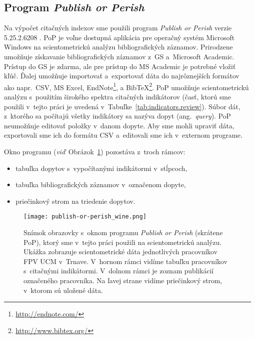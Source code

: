 \subsection{Program \emph{Publish or Perish}}
\label{sec:pop}

Na výpočet citačných indexov sme použili program \emph{Publish or Perish} verzie
5.25.2.6208 \citep{Harzing2011}.  PoP je voľne dostupná aplikácia pre operačný
systém Microsoft Windows na scientometrickú analýzu bibliografických záznamov.
Prirodzene umožňuje získavanie bibliografických záznamov z~GS a~Microsoft
Academic.  Prístup do GS je zdarma, ale pre prístup do MS Academic je potrebné
vložiť kľúč.  Ďalej umožňuje importovať a~exportovať dáta do najrôznejších
formátov ako napr.~CSV, MS Excel, EndNote\footnote{\url{http://endnote.com/}},
a BibTeX\footnote{\url{http://www.bibtex.org/}}.  PoP umožňuje scientometrickú
analýzu s~použitím širokého spektra citačných indikátorov (časť, ktorú sme
použili v~tejto práci je uvedená v~Tabuľke~\ref{tab:indicators.review}).  Súbor
dát, z~ktorého sa počítajú všetky indikátory sa nazýva dopyt
(ang.~\emph{query}).  PoP neumožňuje editovať položky v~danom dopyte.  Aby sme
mohli upraviť dáta, exportovali sme ich do formátu CSV a~editovali sme ich
v~externom programe.

Okno programu (\emph{viď}~Obrázok~\ref{fig:pop.screenshot}) pozostáva z~troch
rámcov:
\begin{itemize}
\item tabuľka dopytov s~vypočítanými indikátormi v~stĺpcoch,
\item tabuľka bibliografických záznamov v~označenom dopyte,
\item priečinkový strom na triedenie dopytov.
\end{itemize}

\begin{figure}
  \centering
  \texttt{[image: publish-or-perish\_wine.png]}
  \caption[Snímok obrazovky s~oknom programu \emph{Publish or Perish}]%
  {Snímok obrazovky s~oknom programu \emph{Publish or Perish} (skrátene PoP),
    ktorý sme v~tejto práci použili na scientometrickú analýzu.  Ukážka
    zobrazuje scientometrické dáta jednotlivých pracovníkov FPV UCM
    v~Trnave.  V~hornom rámci vidíme tabuľku pracovníkov s~citačnými
    indikátormi.  V~dolnom rámci je zoznam publikácií označeného pracovníka.  Na
    ľavej strane vidíme priečinkový strom, v~ktorom sú uložené dáta.}
  \label{fig:pop.screenshot}
\end{figure}


